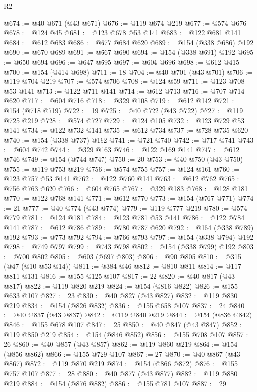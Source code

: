 \begin{lexlean}{R2}
\begin{coremodule}
@674 := @40 @671 (@43 @671)
@676 := @119 @674 @219
@677 := @574 @676
@678 := @124 @45
@681 := @123 @678 @53 @141
@683 := @122 @681 @141
@684 := @612 @683
@686 := @677 @684 @620
@689 := @154 (@338 @686) @192
@690 := @670 @689
@691 := @667 @690
@694 := @154 (@338 @691) @192
@695 := @650 @694
@696 := @647 @695
@697 := @604 @696
@698 := @612 @415
@700 := @154 (@414 @698)
@701 := 18
@704 := @40 @701 (@43 @701)
@706 := @119 @704 @219
@707 := @574 @706
@708 := @124 @59
@711 := @123 @708 @53 @141
@713 := @122 @711 @141
@714 := @612 @713
@716 := @707 @714 @620
@717 := @604 @716
@718 := @329 @108
@719 := @612 @142
@721 := @154 (@718 @719)
@722 := 19
@725 := @40 @722 (@43 @722)
@727 := @119 @725 @219
@728 := @574 @727
@729 := @124 @105
@732 := @123 @729 @53 @141
@734 := @122 @732 @141
@735 := @612 @734
@737 := @728 @735 @620
@740 := @154 (@338 @737) @192
@741 := @721 @740
@742 := @717 @741
@743 := @604 @742
@744 := @329 @163
@746 := @122 @169 @141
@747 := @612 @746
@749 := @154 (@744 @747)
@750 := 20
@753 := @40 @750 (@43 @750)
@755 := @119 @753 @219
@756 := @574 @755
@757 := @124 @161
@760 := @123 @757 @53 @141
@762 := @122 @760 @141
@763 := @612 @762
@765 := @756 @763 @620
@766 := @604 @765
@767 := @329 @183
@768 := @128 @181
@770 := @122 @768 @141
@771 := @612 @770
@773 := @154 (@767 @771)
@774 := 21
@777 := @40 @774 (@43 @774)
@779 := @119 @777 @219
@780 := @574 @779
@781 := @124 @181
@784 := @123 @781 @53 @141
@786 := @122 @784 @141
@787 := @612 @786
@789 := @780 @787 @620
@792 := @154 (@338 @789) @192
@793 := @773 @792
@794 := @766 @793
@797 := @154 (@338 @794) @192
@798 := @749 @797
@799 := @743 @798
@802 := @154 (@338 @799) @192
@803 := @700 @802
@805 := @603 (@697 @803)
@806 := @90 @805
@810 := @315 (@47 (@10 @53 @14))
@811 := @384 @46
@812 := @810 @811
@814 := @117 @811 @131
@816 := @155 @125 @107
@817 := 22
@820 := @40 @817 (@43 @817)
@822 := @119 @820 @219
@824 := @154 (@816 @822)
@826 := @155 @633 @107
@827 := 23
@830 := @40 @827 (@43 @827)
@832 := @119 @830 @219
@834 := @154 (@826 @832)
@836 := @155 @658 @107
@837 := 24
@840 := @40 @837 (@43 @837)
@842 := @119 @840 @219
@844 := @154 (@836 @842)
@846 := @155 @678 @107
@847 := 25
@850 := @40 @847 (@43 @847)
@852 := @119 @850 @219
@854 := @154 (@846 @852)
@856 := @155 @708 @107
@857 := 26
@860 := @40 @857 (@43 @857)
@862 := @119 @860 @219
@864 := @154 (@856 @862)
@866 := @155 @729 @107
@867 := 27
@870 := @40 @867 (@43 @867)
@872 := @119 @870 @219
@874 := @154 (@866 @872)
@876 := @155 @757 @107
@877 := 28
@880 := @40 @877 (@43 @877)
@882 := @119 @880 @219
@884 := @154 (@876 @882)
@886 := @155 @781 @107
@887 := 29

\end{coremodule}
\end{lexlean}

